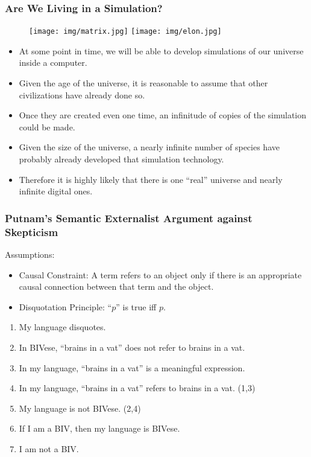 \documentclass[UTF8,11pt,colorlinks,compress,openany]{beamer}%
\begin{document}
\begin{frame}\frametitle{Are We Living in a Simulation?}
\begin{figure}[H]
\texttt{[image: img/matrix.jpg]}
\texttt{[image: img/elon.jpg]}
\end{figure}
\begin{itemize}
		\item At some point in time, we will be able to develop simulations of our universe inside a computer.
		\item Given the age of the universe, it is reasonable to assume that other civilizations have already done so.
		\item Once they are created even one time, an infinitude of copies of the simulation could be made.
		\item Given the size of the universe, a nearly infinite number of species have probably already developed that simulation technology.
		\item Therefore it is highly likely that there is one ``real'' universe and nearly infinite digital ones.
	\end{itemize}	
\end{frame}

\begin{frame}\frametitle{Putnam's Semantic Externalist Argument against Skepticism}
Assumptions:
\begin{itemize}
	\item Causal Constraint: A term refers to an object only if there is an appropriate causal connection between that term and the object.
	\item Disquotation Principle: ``$p$'' is true iff $p$.
\end{itemize}
\begin{enumerate}
	\item My language disquotes.
	\item In BIVese, ``brains in a vat'' does not refer to brains in a vat.
	\item In my language, ``brains in a vat'' is a meaningful expression.
	\item In my language, ``brains in a vat'' refers to brains in a vat. (1,3)
	\item My language is not BIVese. (2,4)
	\item If I am a BIV, then my language is BIVese.
	\item I am not a BIV.
\end{enumerate}
\end{frame}
\end{document}
